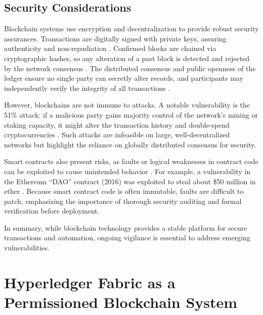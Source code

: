 \documentclass[a4paper,10pt]{report}
\begin{document}
\subsection{Security Considerations}

Blockchain systems use encryption and decentralization to provide robust security assurances. Transactions are digitally signed with private keys, assuring authenticity and non-repudiation \cite{yaga2018nist}. Confirmed blocks are chained via cryptographic hashes, so any alteration of a past block is detected and rejected by the network consensus \cite{yaga2018nist}. The distributed consensus and public openness of the ledger ensure no single party can secretly alter records, and participants may independently verify the integrity of all transactions \cite{hussein2023consensus}. 

However, blockchains are not immune to attacks. A notable vulnerability is the 51\% attack: if a malicious party gains majority control of the network’s mining or staking capacity, it might alter the transaction history and double-spend cryptocurrencies \cite{yaga2018nist}. Such attacks are infeasible on large, well-decentralized networks but highlight the reliance on globally distributed consensus for security. 

Smart contracts also present risks, as faults or logical weaknesses in contract code can be exploited to cause unintended behavior \cite{atzei2017ethereum}. For example, a vulnerability in the Ethereum “DAO” contract (2016) was exploited to steal about \$50 million in ether \cite{atzei2017ethereum}. Because smart contract code is often immutable, faults are difficult to patch, emphasizing the importance of thorough security auditing and formal verification before deployment. 

In summary, while blockchain technology provides a stable platform for secure transactions and automation, ongoing vigilance is essential to address emerging vulnerabilities.


\section{Hyperledger Fabric as a Permissioned Blockchain System}
\end{document}
